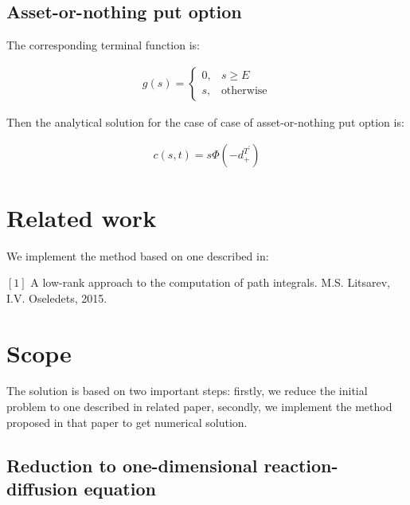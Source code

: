 \documentclass[11pt,a4paper]{extarticle}
\begin{document}
\subsection{Asset-or-nothing put option}

The corresponding terminal function is:

\begin{equation}
    \begin{aligned}
    g(s)=\begin{cases}0,&s\geq E \\ s,&\text{otherwise}\end{cases}
    \end{aligned}
    \end{equation}

Then the analytical solution for the case of case of asset-or-nothing put option is:

\begin{equation}
    \begin{aligned}
    c(s,t) =s\Phi(-d_{+}^{T^\prime})
    \end{aligned}
    \end{equation}

\section{Related work}

We implement the method based on one described in:

     $[1]$  A low-rank approach to the computation of path integrals. M.S. Litsarev, I.V. Oseledets, 2015.
    
\section{Scope}

The solution is based on two important steps: firstly, we reduce the initial problem to one described in related paper, secondly, we implement the method proposed in that paper to get numerical solution. 

\subsection{Reduction to one-dimensional reaction-diffusion equation}
\end{document}

